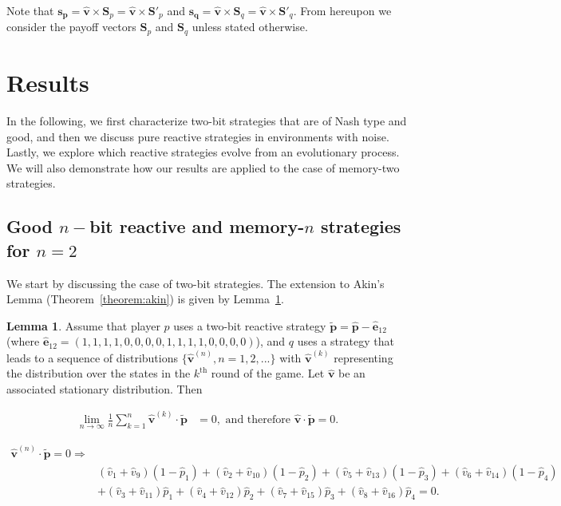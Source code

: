 \documentclass{article}
\theoremstyle{definition}
\newtheorem{lemma}[theorem]{Lemma}
\begin{document}
Note that \(\mathbf{s_{p}} = \mathbf{\hat{v}} \times \mathbf{S}_{p} =
\mathbf{\hat{v}} \times \mathbf{S}'_{p}\) and \(\mathbf{s_{q}} =\mathbf{\hat{v}}
\times \mathbf{S}_{q} = \mathbf{\hat{v}} \times \mathbf{S}'_{q}\). From
hereupon we consider the payoff vectors \(\mathbf{S}_{p}\) and
\(\mathbf{S}_{q}\) unless stated otherwise.

\section{Results}\label{section:results}

In the following, we first characterize two-bit strategies that
are of Nash type and good, and then we discuss pure reactive strategies in
environments with noise. Lastly, we explore which reactive strategies evolve
from an evolutionary process. We will also demonstrate how our results
are applied to the case of memory-two strategies.

\subsection{Good \(n-\)bit reactive and memory-\(n\) strategies for
\(n=2\)}\label{section:good_nash_strategies}

We start by discussing the case of two-bit strategies. The extension to Akin's
Lemma (Theorem~\ref{theorem:akin}) is given by Lemma~\ref{lemma:akin_extended}.

\begin{lemma}\label{lemma:akin_extended}
  Assume that player \(p\) uses a two-bit reactive strategy \(\mathbf{\tilde{p}} = \mathbf{\hat{p}} - \mathbf{\hat{e}}_{1 2}\)
  (where \(\mathbf{\hat{e}}_{1 2} = (1, 1, 1, 1, \allowbreak 0,
  0, 0, 0, 1, 1, 1, 1, 0, 0, 0, 0)\)), and \(q\) uses a strategy that leads to a sequence
  of distributions \(\{\mathbf{\hat{v}}^{(n)}, n = 1, 2, ...\}\) with
  \(\mathbf{\hat{v}}^{(k)}\) representing the distribution over the states in the
  \(k^{\text{th}}\) round of the game. Let \(\mathbf{\hat{v}}\) be an associated
  stationary distribution. Then

  \begin{align*}
    \lim_{n \rightarrow \infty} \frac{1}{n} \sum_{k=1}^{n} \mathbf{\hat{v}}^{(k)} \cdot\mathbf{\tilde{p}} & = 0, \text{ and therefore } \mathbf{\hat{v}} \cdot \mathbf{\tilde{p}} = 0.
  \end{align*}

  \begin{align}\label{eq:akin_extended}
  \mathbf{\hat{v}}^{(n)} \cdot \mathbf{\tilde{p}} = 0 \Rightarrow & \nonumber \\
  & (\hat{v}_{1} + \hat{v}_{9}) (1 - \hat{p}_1) + (\hat{v}_{2} + \hat{v}_{10}) (1 - \hat{p}_2)  + (\hat{v}_{5} + \hat{v}_{13}) (1 - \hat{p}_3) + (\hat{v}_{6} + \hat{v}_{14}) (1 - \hat{p}_4) \nonumber \\
  & + (\hat{v}_{3} + \hat{v}_{11})\hat{p}_1  + (\hat{v}_{4} + \hat{v}_{12})\hat{p}_2 + (\hat{v}_{7} + \hat{v}_{15}) \hat{p}_3 + (\hat{v}_{8} + \hat{v}_{16}) \hat{p}_4 = 0.
  \end{align}
\end{lemma}
\end{document}
